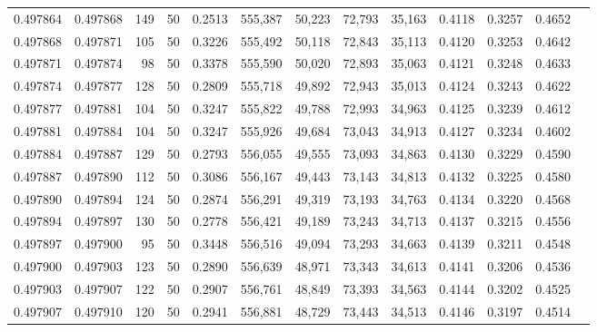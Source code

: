 \begin{tabular}{rrrrrrrrrrrrr}
0.497864 & 0.497868 &   149 &  50 &                                     0.2513 & 555,387 &  50,223 &  72,793 &  35,163 & 0.4118 & 0.3257 & 0.4652 \\
0.497868 & 0.497871 &   105 &  50 &                                     0.3226 & 555,492 &  50,118 &  72,843 &  35,113 & 0.4120 & 0.3253 & 0.4642 \\
0.497871 & 0.497874 &    98 &  50 &                                     0.3378 & 555,590 &  50,020 &  72,893 &  35,063 & 0.4121 & 0.3248 & 0.4633 \\
0.497874 & 0.497877 &   128 &  50 &                                     0.2809 & 555,718 &  49,892 &  72,943 &  35,013 & 0.4124 & 0.3243 & 0.4622 \\
0.497877 & 0.497881 &   104 &  50 &                                     0.3247 & 555,822 &  49,788 &  72,993 &  34,963 & 0.4125 & 0.3239 & 0.4612 \\
0.497881 & 0.497884 &   104 &  50 &                                     0.3247 & 555,926 &  49,684 &  73,043 &  34,913 & 0.4127 & 0.3234 & 0.4602 \\
0.497884 & 0.497887 &   129 &  50 &                                     0.2793 & 556,055 &  49,555 &  73,093 &  34,863 & 0.4130 & 0.3229 & 0.4590 \\
0.497887 & 0.497890 &   112 &  50 &                                     0.3086 & 556,167 &  49,443 &  73,143 &  34,813 & 0.4132 & 0.3225 & 0.4580 \\
0.497890 & 0.497894 &   124 &  50 &                                     0.2874 & 556,291 &  49,319 &  73,193 &  34,763 & 0.4134 & 0.3220 & 0.4568 \\
0.497894 & 0.497897 &   130 &  50 &                                     0.2778 & 556,421 &  49,189 &  73,243 &  34,713 & 0.4137 & 0.3215 & 0.4556 \\
0.497897 & 0.497900 &    95 &  50 &                                     0.3448 & 556,516 &  49,094 &  73,293 &  34,663 & 0.4139 & 0.3211 & 0.4548 \\
0.497900 & 0.497903 &   123 &  50 &                                     0.2890 & 556,639 &  48,971 &  73,343 &  34,613 & 0.4141 & 0.3206 & 0.4536 \\
0.497903 & 0.497907 &   122 &  50 &                                     0.2907 & 556,761 &  48,849 &  73,393 &  34,563 & 0.4144 & 0.3202 & 0.4525 \\
0.497907 & 0.497910 &   120 &  50 &                                     0.2941 & 556,881 &  48,729 &  73,443 &  34,513 & 0.4146 & 0.3197 & 0.4514 \\

\end{tabular}
